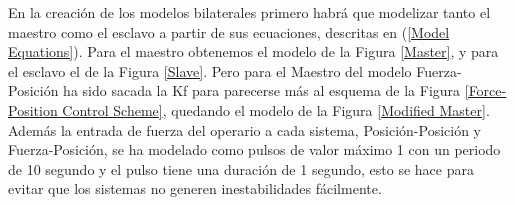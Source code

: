 \documentclass[a4paper, fontsize=11pt]{scrartcl} %
\numberwithin{equation}{section} %
\numberwithin{figure}{section} %
\numberwithin{table}{section} %
\begin{document}
	En la creación de los modelos bilaterales primero habrá que modelizar tanto el maestro como el esclavo a partir de sus ecuaciones, descritas en (\ref{Model Equations}). Para el maestro obtenemos el modelo de la Figura \ref{Master}, y para el esclavo el de la Figura \ref{Slave}. Pero para el Maestro del modelo Fuerza-Posición ha sido sacada la Kf para parecerse más al esquema de la Figura \ref{Force-Position Control Scheme}, quedando el modelo de la Figura \ref{Modified Master}.\\
	
	Además la entrada de fuerza del operario a cada sistema, Posición-Posición y Fuerza-Posición, se ha modelado como pulsos de valor máximo 1 con un periodo de 10 segundo y el pulso tiene una duración de 1 segundo, esto se hace para evitar que los sistemas no generen inestabilidades fácilmente.\\
	
\end{document}

